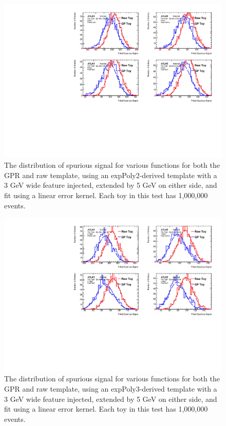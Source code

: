 \begin{figure} 
\begin{center}
  \includegraphics[width=\textwidth]{figures/background/gpr/validation/linear/ToyTest_FitSigVals_lowpT_1M_Sig}   
\caption{The distribution of spurious signal for various functions for both the GPR and raw template, using an expPoly2-derived template with a 3 GeV wide feature injected, extended by 5 GeV on either side, and fit using a linear error kernel. Each toy in this test has 1,000,000 events.}
\label{fig:linearkernel_lowpt_1M_Sig}
\end{center}
\end{figure}

\begin{figure} 
\begin{center}
  \includegraphics[width=\textwidth]{figures/background/gpr/validation/linear/ToyTest_FitSigVals_medpT_1M_Sig}   
\caption{The distribution of spurious signal for various functions for both the GPR and raw template, using an expPoly3-derived template with a 3 GeV wide feature injected, extended by 5 GeV on either side, and fit using a linear error kernel. Each toy in this test has 1,000,000 events.}
\label{fig:linearkernel_medpt_1M_Sig}
\end{center}
\end{figure}

